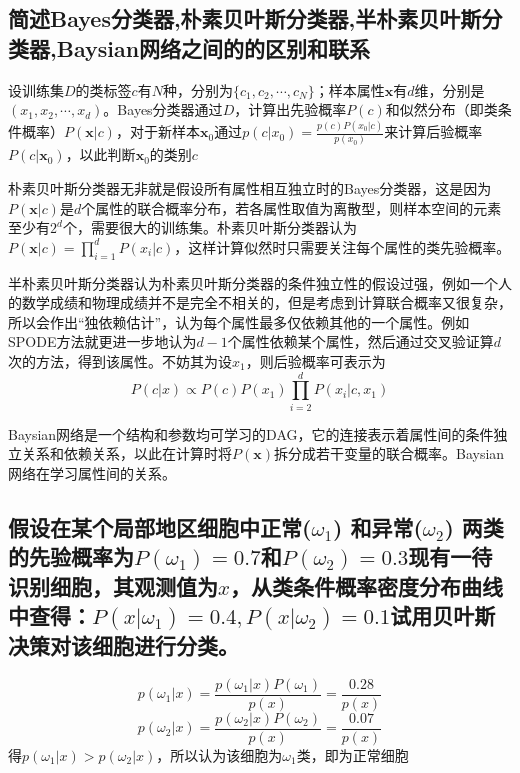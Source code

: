 \documentclass[12pt, a4paper, oneside]{ctexart}
\begin{document}
\subsection{简述Bayes分类器,朴素贝叶斯分类器,半朴素贝叶斯分类器,Baysian网络之间的的区别和联系}
\par 
设训练集$D$的类标签$c$有$N$种，分别为$\{c_1,c_2,\cdots,c_N\}$；样本属性$\boldsymbol{x}$有$d$维，分别是$(x_1,x_2,\cdots,x_d)$。Bayes分类器通过$D$，计算出先验概率$P(c)$和似然分布（即类条件概率）$P(\boldsymbol{x}|c)$，对于新样本${\boldsymbol{x}}_0$通过$p(c|x_0)=\frac{p(c)P(x_0|c)}{p(x_0)}$来计算后验概率$P(c|{\boldsymbol{x}}_0)$，以此判断${\boldsymbol{x}}_0$的类别$c$
\par
朴素贝叶斯分类器无非就是假设所有属性相互独立时的Bayes分类器，这是因为$P(\boldsymbol{x}|c)$是$d$个属性的联合概率分布，若各属性取值为离散型，则样本空间的元素至少有$2^d$个，需要很大的训练集。朴素贝叶斯分类器认为$P(\boldsymbol{x}|c)=\prod_{i=1}^d{P(x_i|c)}$，这样计算似然时只需要关注每个属性的类先验概率。
\par
半朴素贝叶斯分类器认为朴素贝叶斯分类器的条件独立性的假设过强，例如一个人的数学成绩和物理成绩并不是完全不相关的，但是考虑到计算联合概率又很复杂，所以会作出“独依赖估计”，认为每个属性最多仅依赖其他的一个属性。例如SPODE方法就更进一步地认为$d-1$个属性依赖某个属性，然后通过交叉验证算$d$次的方法，得到该属性。不妨其为设$x_1$，则后验概率可表示为
$$P(c|x)\propto P(c)P(x_1)\prod_{i=2}^d{P(x_i|c,x_1)}$$
\par
Baysian网络是一个结构和参数均可学习的DAG，它的连接表示着属性间的条件独立关系和依赖关系，以此在计算时将$P(\boldsymbol{x})$拆分成若干变量的联合概率。Baysian网络在学习属性间的关系。
\subsection{假设在某个局部地区细胞中正常(\texorpdfstring{${\omega}_1$},) 和异常(\texorpdfstring{${\omega}_2$},) 两类的先验概率为\texorpdfstring{$P({\omega}_1)=0.7$},和\texorpdfstring{$P({\omega}_2)=0.3$},现有一待识别细胞，其观测值为\texorpdfstring{$x$},，从类条件概率密度分布曲线中查得：\texorpdfstring{$P(x|{\omega}_1)=0.4,P(x|{\omega}_2)=0.1$},试用贝叶斯决策对该细胞进行分类。}
$$p({\omega}_1|x)=\frac{p({\omega}_1|x)P({\omega}_1)}{p(x)}=\frac{0.28}{p(x)}$$
$$p({\omega}_2|x)=\frac{p({\omega}_2|x)P({\omega}_2)}{p(x)}=\frac{0.07}{p(x)}$$
得$p({\omega}_1|x)>p({\omega}_2|x)$，所以认为该细胞为${\omega}_1$类，即为正常细胞
\end{document}
